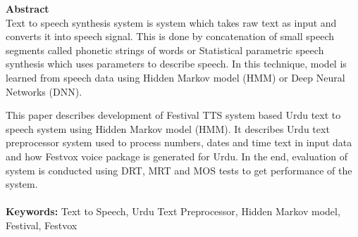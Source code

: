 
{\LARGE\textbf {Abstract}} \\ %
Text to speech synthesis system is system which takes raw text as input and converts it into speech signal.
This is done by concatenation of small speech segments called phonetic strings of words or
Statistical parametric speech synthesis which uses parameters to describe speech. In
this technique, model is learned from speech data using Hidden Markov model (HMM) or Deep Neural Networks (DNN).


This paper describes development of Festival TTS system based Urdu text to speech system using Hidden Markov model (HMM). It describes Urdu text preprocessor
system used to process numbers, dates and time text in input data and how Festvox voice package is generated for Urdu. In the end, evaluation of
system is conducted using DRT, MRT and MOS tests to get performance of the system. 
\\ \\
\textbf{Keywords:}
Text to Speech, Urdu Text Preprocessor, Hidden Markov model, Festival, Festvox
